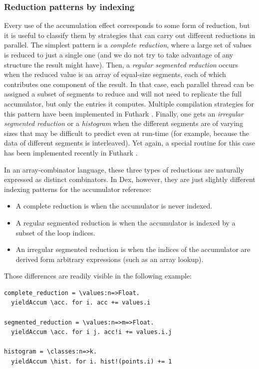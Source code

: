 \documentclass[acmsmall,screen,nonacm]{acmart}
\newlength{\codeindent}
\begin{document}
\subsubsection{Reduction patterns by indexing}
\label{sec:parallel-accum}

Every use of the accumulation effect corresponds to some form of reduction, but it is useful to classify them by strategies that can carry out different reductions in parallel.
The simplest pattern is a \emph{complete reduction}, where a large set of values is reduced to just a single one (and we do not try to take advantage of any structure the result might have).
Then, a \emph{regular segmented reduction} occurs when the reduced value is an array of equal-size segments, each of which contributes one component of the result.
In that case, each parallel thread can be assigned a subset of segments to reduce and will not need to replicate the full accumulator, but only the entries it computes.
Multiple compilation strategies for this pattern have been implemented in Futhark \cite{larsen2017strategies}.
Finally, one gets an \emph{irregular segmented reduction} or a \emph{histogram} when the different segments are of varying sizes that may be difficult to predict even at run-time (for example, because the data of different segments is interleaved).
Yet again, a special routine for this case has been implemented recently in Futhark \cite{henriksen2020histograms}.

In an array-combinator language, these three types of reductions are naturally expressed as distinct combinators.
In Dex, however, they are just slightly different indexing patterns for the accumulator reference:
\begin{itemize}
\item A complete reduction is when the accumulator is never indexed.
\item A regular segmented reduction is when the accumulator is indexed by a subset of the loop indices.
\item An irregular segmented reduction is when the indices of the accumulator are derived form arbitrary expressions (such as an array lookup).
\end{itemize}
Those differences are readily visible in the following example:
\begin{Verbatim}[xleftmargin=\codeindent,fontsize=\small]
complete_reduction = \values:n=>Float.
  yieldAccum \acc. for i. acc += values.i

segmented_reduction = \values:n=>m=>Float.
  yieldAccum \acc. for i j. acc!i += values.i.j

histogram = \classes:n=>k.
  yieldAccum \hist. for i. hist!(points.i) += 1
\end{Verbatim}
\end{document}
